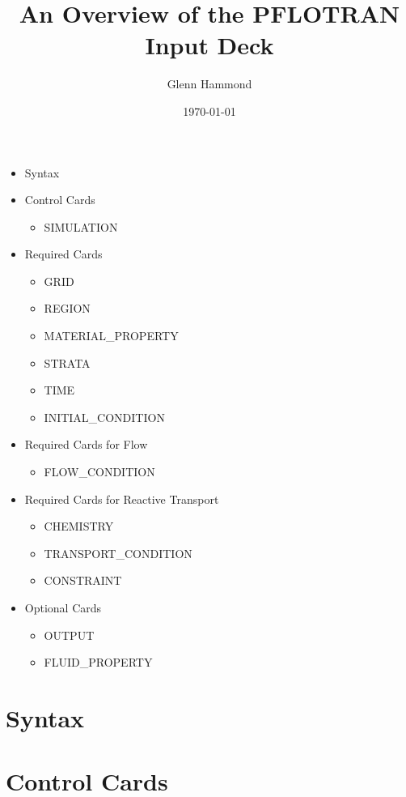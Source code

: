 \documentclass{beamer}
\title{An Overview of the PFLOTRAN Input Deck}
\author{Glenn Hammond}
\date{\today}
\begin{document}
\frame{\titlepage}

\begin{frame}
\footnotesize
\begin{itemize}
\item[] {\color{blue}Syntax}
\item[] {\color{blue}Control Cards}
\begin{itemize}
\item[] SIMULATION
\end{itemize}
\item[] {\color{blue}Required Cards}
\begin{itemize}
\item[] GRID
\item[] REGION
\item[] MATERIAL\_PROPERTY
\item[] STRATA
\item[] TIME
\item[] INITIAL\_CONDITION
\end{itemize}
\item[] {\color{blue}Required Cards for Flow}
\begin{itemize}
\item[] FLOW\_CONDITION
\end{itemize}
\item[] {\color{blue}Required Cards for Reactive Transport}
\begin{itemize}
\item[] CHEMISTRY
\item[] TRANSPORT\_CONDITION
\item[] CONSTRAINT
\end{itemize}
\item[] {\color{blue}Optional Cards}
\begin{itemize}
\item[] OUTPUT
\item[] FLUID\_PROPERTY
\end{itemize}
\end{itemize}
\end{frame}

\section{Syntax}


\section{Control Cards}
\end{document}
